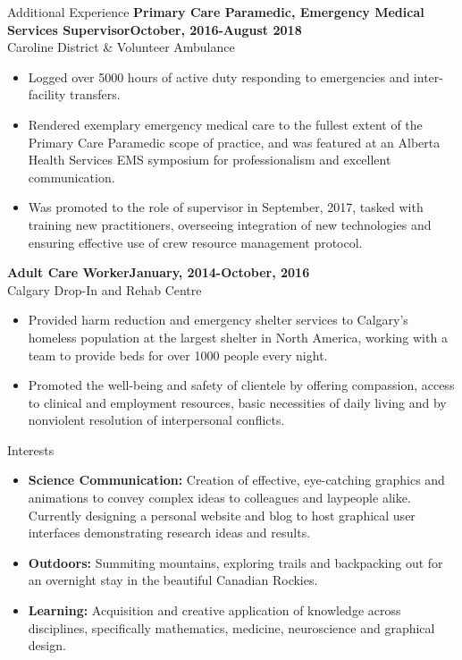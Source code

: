 \documentclass[12pt]{resume}
\begin{document}
\begin{rSection}{\Large Additional Experience}
    {\bf Primary Care Paramedic, Emergency Medical Services Supervisor\hfill {October, 2016-August 2018}}\\
    Caroline District \& Volunteer Ambulance
    \begin{itemize} 
        \setlength\itemsep{-0.5em}
        \item Logged over 5000 hours of active duty responding to emergencies and inter-facility transfers.
        \item Rendered exemplary emergency medical care to the fullest extent of the Primary Care Paramedic scope of
        practice, and was featured at an Alberta Health Services EMS symposium for professionalism and 
        excellent communication.
        \item Was promoted to the role of supervisor in September, 2017, tasked with training new practitioners, 
        overseeing integration of new technologies and ensuring effective use of crew resource management protocol.
    \end{itemize}
    {\bf Adult Care Worker\hfill {January, 2014-October, 2016}}\\
    Calgary Drop-In and Rehab Centre
    \begin{itemize}
        \setlength\itemsep{-0.5em}
        \item Provided harm reduction and emergency shelter services to Calgary's homeless population at the largest 
        shelter in North America, working with a team to provide beds for over 1000 people every night.
        \item Promoted the well-being and safety of clientele by offering compassion, access to clinical and employment
        resources, basic necessities of daily living and by nonviolent resolution of interpersonal conflicts. 
    \end{itemize}
\end{rSection}


\vspace{12pt}
\begin{rSection}{\Large Interests}
    \begin{itemize}
        \setlength\itemsep{-0.5em}
        \item {\bf Science Communication:} Creation of effective, eye-catching graphics and animations to convey complex
        ideas to colleagues and laypeople alike. Currently designing a personal website and blog to host 
        graphical user interfaces demonstrating research ideas and results.
        \item {\bf Outdoors:} Summiting mountains, exploring trails and backpacking out for an overnight stay in the beautiful
        Canadian Rockies. 
        \item {\bf Learning:} Acquisition and creative application of knowledge across disciplines, specifically mathematics, medicine,
        neuroscience and graphical design.
    \end{itemize}
\end{rSection}
\end{document}

